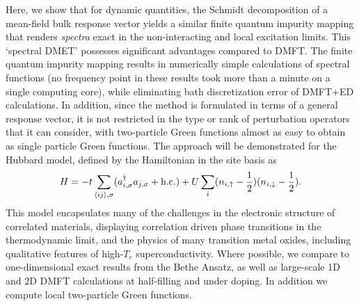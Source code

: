 \documentclass[aps,twocolumn,nobibnotes]{revtex4}
\begin{document}
Here, we show that for dynamic quantities, the Schmidt decomposition of a mean-field bulk response vector yields a similar finite quantum impurity mapping
that renders {\em spectra} exact in the non-interacting and local excitation limits. This `spectral DMET' possesses significant advantages compared to
DMFT. The finite quantum impurity mapping results in numerically simple calculations of spectral functions (no frequency point in these results
took more than a minute on a single computing core), while eliminating bath discretization error of DMFT+ED calculations.
In addition, since the method is formulated in terms of a general response vector, it is not restricted in the type or rank of perturbation 
operators that it can consider, with two-particle Green functions almost as easy to obtain as single particle Green functions. 
The approach will be demonstrated for the Hubbard model, 
defined by the Hamiltonian in the site basis as
\begin{equation}
H = -t \sum_{\langle ij \rangle, \sigma} (a_{i,\sigma}^{\dagger}a_{j,\sigma} + \text{\textnormal {h.c.}}) + U \sum_i (n_{i,\uparrow} - \frac{1}{2})(n_{i,\downarrow} - \frac{1}{2})  . \label{eqn:hub}
\end{equation}
This model encapsulates many of the challenges in the electronic structure of correlated materials, displaying correlation driven 
phase transitions in the thermodynamic limit, and the physics of many transition metal oxides\cite{Limelette2003}, including qualitative features 
of high-$T_c$ superconductivity\cite{Anderson87,Sordi2012,Millis2013}. Where possible, we compare to one-dimensional exact results from the Bethe 
Ansatz\cite{Lieb68,Ovchinni1970}, as well as large-scale 1D and 2D DMFT calculations at half-filling and under doping\cite{Go2009,Kotliar2008,Masatoshi2009}. 
In addition we compute local two-particle Green functions.
\end{document}
